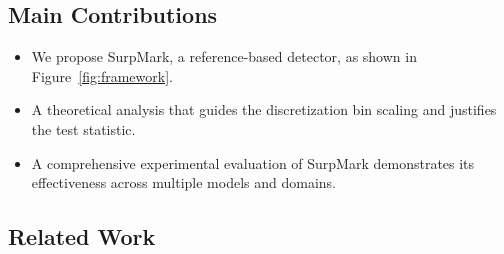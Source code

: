 \documentclass{article}
\theoremstyle{plain}
\theoremstyle{definition}
\theoremstyle{remark}
\begin{document}
\subsection{Main Contributions}
\begin{itemize}[noitemsep]
    \item We propose SurpMark, a reference-based detector, as shown in Figure~\ref{fig:framework}. 
    \item A theoretical analysis that guides the discretization bin scaling and justifies the test statistic.
    \item A comprehensive experimental evaluation of SurpMark demonstrates its effectiveness across multiple models and domains.  
\end{itemize}
\subsection{Related Work}
\end{document}

